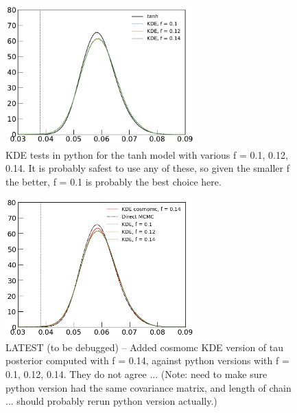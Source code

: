 \documentclass[prd,amsmath,amssymb,floatfix,superscriptaddress,nofootinbib]{revtex4-1}
\begin{document}
\begin{figure}
\includegraphics[width=0.65\textwidth]{python_kde/pl18_pc_zmax30_pliklite_srollv2_1015_tau_posterior_fraccov_1p0_burnin_10000_yes_norm_gaussian0p1_0p12_0p14.pdf}
\caption{KDE tests in python for the tanh model with various f = 0.1, 0.12, 0.14. It is probably safest to use any of these, so given the smaller f the better, f = 0.1 is probably the best choice here.
}
\label{fig:}
\end{figure}

\begin{figure}
\includegraphics[width=0.65\textwidth]{cosmomc_kde/direct_mcmc_vs_python_kde_and_cosmomc_kde_tanh_tau.png}
\caption{LATEST (to be debugged) -- Added cosmomc KDE version of tau posterior computed with f = 0.14, against python versions with f = 0.1, 0.12, 0.14. They do not agree ... (Note: need to make sure python version had the same covariance matrix, and length of chain ... should probably rerun python version actually.)
}
\label{fig:}
\end{figure}
\end{document}
